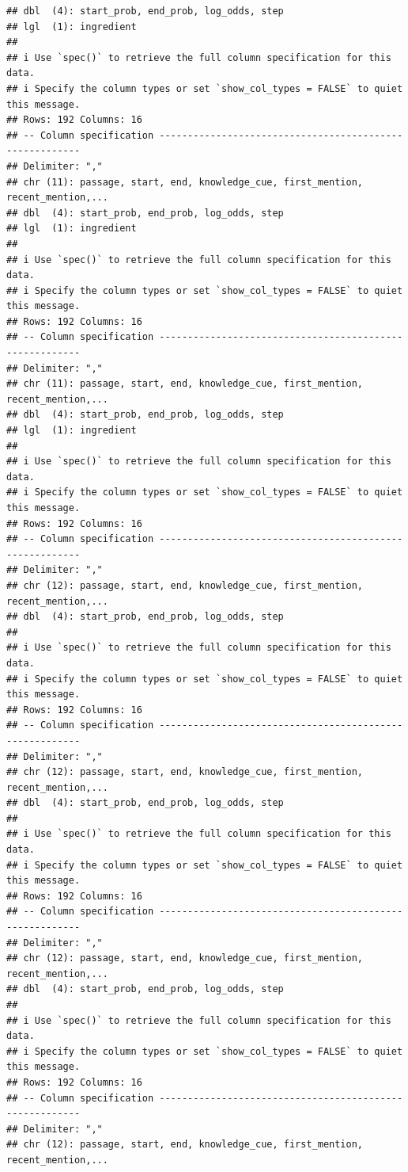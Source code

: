 \documentclass[
]{article}
\begin{document}
\begin{verbatim}
## dbl  (4): start_prob, end_prob, log_odds, step
## lgl  (1): ingredient
## 
## i Use `spec()` to retrieve the full column specification for this data.
## i Specify the column types or set `show_col_types = FALSE` to quiet this message.
## Rows: 192 Columns: 16
## -- Column specification --------------------------------------------------------
## Delimiter: ","
## chr (11): passage, start, end, knowledge_cue, first_mention, recent_mention,...
## dbl  (4): start_prob, end_prob, log_odds, step
## lgl  (1): ingredient
## 
## i Use `spec()` to retrieve the full column specification for this data.
## i Specify the column types or set `show_col_types = FALSE` to quiet this message.
## Rows: 192 Columns: 16
## -- Column specification --------------------------------------------------------
## Delimiter: ","
## chr (11): passage, start, end, knowledge_cue, first_mention, recent_mention,...
## dbl  (4): start_prob, end_prob, log_odds, step
## lgl  (1): ingredient
## 
## i Use `spec()` to retrieve the full column specification for this data.
## i Specify the column types or set `show_col_types = FALSE` to quiet this message.
## Rows: 192 Columns: 16
## -- Column specification --------------------------------------------------------
## Delimiter: ","
## chr (12): passage, start, end, knowledge_cue, first_mention, recent_mention,...
## dbl  (4): start_prob, end_prob, log_odds, step
## 
## i Use `spec()` to retrieve the full column specification for this data.
## i Specify the column types or set `show_col_types = FALSE` to quiet this message.
## Rows: 192 Columns: 16
## -- Column specification --------------------------------------------------------
## Delimiter: ","
## chr (12): passage, start, end, knowledge_cue, first_mention, recent_mention,...
## dbl  (4): start_prob, end_prob, log_odds, step
## 
## i Use `spec()` to retrieve the full column specification for this data.
## i Specify the column types or set `show_col_types = FALSE` to quiet this message.
## Rows: 192 Columns: 16
## -- Column specification --------------------------------------------------------
## Delimiter: ","
## chr (12): passage, start, end, knowledge_cue, first_mention, recent_mention,...
## dbl  (4): start_prob, end_prob, log_odds, step
## 
## i Use `spec()` to retrieve the full column specification for this data.
## i Specify the column types or set `show_col_types = FALSE` to quiet this message.
## Rows: 192 Columns: 16
## -- Column specification --------------------------------------------------------
## Delimiter: ","
## chr (12): passage, start, end, knowledge_cue, first_mention, recent_mention,...

\end{verbatim}
\end{document}
